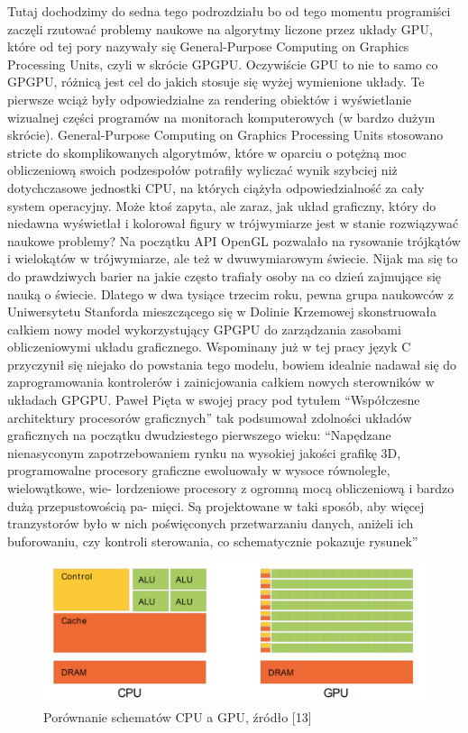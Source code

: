 \documentclass{article}
\begin{document}
	\par
	Tutaj dochodzimy do sedna tego podrozdziału bo od tego momentu programiści zaczęli rzutować problemy naukowe na algorytmy liczone przez układy GPU, które od tej pory nazywały się General-Purpose Computing on Graphics Processing Units, czyli w skrócie GPGPU. Oczywiście GPU to nie to samo co GPGPU, różnicą jest cel do jakich stosuje się wyżej wymienione układy. Te pierwsze wciąż były odpowiedzialne za rendering obiektów i wyświetlanie wizualnej części programów na monitorach komputerowych (w bardzo dużym skrócie). General-Purpose Computing on Graphics Processing Units stosowano stricte do skomplikowanych algorytmów, które w oparciu o potężną moc obliczeniową swoich podzespołów potrafiły wyliczać wynik szybciej niż dotychczasowe jednostki CPU, na których ciążyła odpowiedzialność za cały system operacyjny. Może ktoś zapyta, ale zaraz, jak układ graficzny, który do niedawna wyświetlał i kolorował figury w trójwymiarze jest w stanie rozwiązywać naukowe problemy? Na początku API OpenGL pozwalało na rysowanie trójkątów i wielokątów w trójwymiarze, ale też w dwuwymiarowym świecie. Nijak ma się to do prawdziwych barier na jakie często trafiały osoby na co dzień zajmujące się nauką o świecie. Dlatego w dwa tysiące trzecim roku, pewna grupa naukowców z Uniwersytetu Stanforda mieszczącego się w Dolinie Krzemowej skonstruowała całkiem nowy model wykorzystujący GPGPU do zarządzania zasobami obliczeniowymi układu graficznego. Wspominany już w tej pracy język C przyczynił się niejako do powstania tego modelu, bowiem idealnie nadawał się do zaprogramowania kontrolerów i zainicjowania całkiem nowych sterowników w układach GPGPU. Paweł Pięta w swojej pracy pod tytułem “Współczesne architektury procesorów graficznych” tak podsumował zdolności układów graficznych na początku dwudziestego pierwszego wieku: “Napędzane nienasyconym zapotrzebowaniem rynku na wysokiej jakości grafikę 3D, programowalne procesory graficzne ewoluowały w wysoce równoległe, wielowątkowe, wie- lordzeniowe procesory z ogromną mocą obliczeniową i bardzo dużą przepustowością pa- mięci. Są projektowane w taki sposób, aby więcej tranzystorów było w nich poświęconych przetwarzaniu danych, aniżeli ich buforowaniu, czy kontroli sterowania, co schematycznie pokazuje rysunek”
	\begin{figure}
		\centering
		\includegraphics[width=15cm]{simd}
		\caption{Porównanie schematów CPU a GPU, źródło [13]}
	\end{figure}
\end{document}
